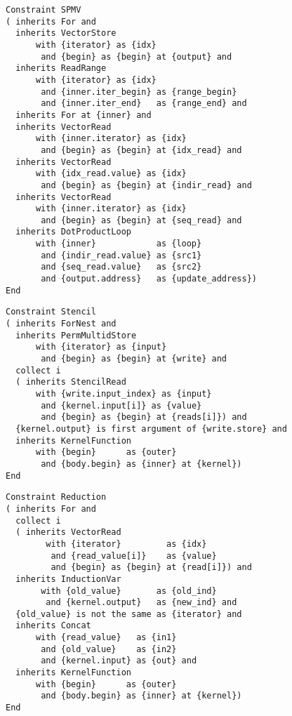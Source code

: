 \begin{figure}[p]
\begin{lstlisting}[language=IDL,
                   label={fig:spmv},caption={IDL specification of SPMV}]
Constraint SPMV
( inherits For and
  inherits VectorStore
      with {iterator} as {idx}
       and {begin} as {begin} at {output} and
  inherits ReadRange
      with {iterator} as {idx} 
       and {inner.iter_begin} as {range_begin} 
       and {inner.iter_end}   as {range_end} and
  inherits For at {inner} and
  inherits VectorRead
      with {inner.iterator} as {idx}
       and {begin} as {begin} at {idx_read} and
  inherits VectorRead
      with {idx_read.value} as {idx}
       and {begin} as {begin} at {indir_read} and
  inherits VectorRead
      with {inner.iterator} as {idx}
       and {begin} as {begin} at {seq_read} and
  inherits DotProductLoop
      with {inner}            as {loop}
       and {indir_read.value} as {src1}
       and {seq_read.value}   as {src2}
       and {output.address}   as {update_address})
End
\end{lstlisting}
\end{figure}

\begin{figure}[p]
\begin{lstlisting}[language=IDL,
                   label={fig:stencilcompute},caption={IDL specification of simple stencil}]
Constraint Stencil
( inherits ForNest and
  inherits PermMultidStore
      with {iterator} as {input} 
       and {begin} as {begin} at {write} and
  collect i
  ( inherits StencilRead
      with {write.input_index} as {input}
       and {kernel.input[i]} as {value}
       and {begin} as {begin} at {reads[i]}) and
  {kernel.output} is first argument of {write.store} and
  inherits KernelFunction
      with {begin}      as {outer}
       and {body.begin} as {inner} at {kernel})
End
\end{lstlisting}
\end{figure}

\begin{figure}[p]
\begin{lstlisting}[language=IDL,
                   label={fig:scalarreduction},caption=
   {IDL specification of scalar reductions}]
Constraint Reduction
( inherits For and
  collect i
  ( inherits VectorRead
        with {iterator}         as {idx}
         and {read_value[i]}    as {value}
         and {begin} as {begin} at {read[i]}) and
  inherits InductionVar
       with {old_value}       as {old_ind}
        and {kernel.output}   as {new_ind} and
  {old_value} is not the same as {iterator} and
  inherits Concat
      with {read_value}   as {in1}
       and {old_value}    as {in2}
       and {kernel.input} as {out} and
  inherits KernelFunction
      with {begin}      as {outer}
       and {body.begin} as {inner} at {kernel})
End
\end{lstlisting}
\end{figure}